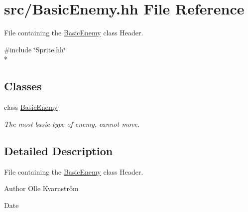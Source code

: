 \hypertarget{BasicEnemy_8hh}{\section{src/\-Basic\-Enemy.hh File Reference}
\label{BasicEnemy_8hh}
}


File containing the \hyperlink{classBasicEnemy}{Basic\-Enemy} class Header.  


{\ttfamily \#include \char`\"{}Sprite.\-hh\char`\"{}}\\*
\subsection*{Classes}
\begin{DoxyCompactItemize}
\item 
class \hyperlink{classBasicEnemy}{Basic\-Enemy}
\begin{DoxyCompactList}\small\item\em The most basic type of enemy, cannot move. \end{DoxyCompactList}\end{DoxyCompactItemize}


\subsection{Detailed Description}
File containing the \hyperlink{classBasicEnemy}{Basic\-Enemy} class Header. \begin{DoxyAuthor}{Author}
Olle Kvarnström 
\end{DoxyAuthor}
\begin{DoxyDate}{Date}

\end{DoxyDate}
